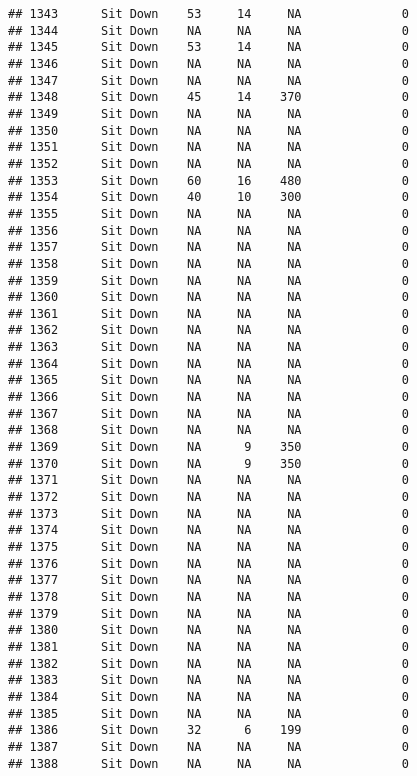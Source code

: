 \documentclass[
]{article}
\begin{document}
\begin{verbatim}
## 1343      Sit Down    53     14     NA              0
## 1344      Sit Down    NA     NA     NA              0
## 1345      Sit Down    53     14     NA              0
## 1346      Sit Down    NA     NA     NA              0
## 1347      Sit Down    NA     NA     NA              0
## 1348      Sit Down    45     14    370              0
## 1349      Sit Down    NA     NA     NA              0
## 1350      Sit Down    NA     NA     NA              0
## 1351      Sit Down    NA     NA     NA              0
## 1352      Sit Down    NA     NA     NA              0
## 1353      Sit Down    60     16    480              0
## 1354      Sit Down    40     10    300              0
## 1355      Sit Down    NA     NA     NA              0
## 1356      Sit Down    NA     NA     NA              0
## 1357      Sit Down    NA     NA     NA              0
## 1358      Sit Down    NA     NA     NA              0
## 1359      Sit Down    NA     NA     NA              0
## 1360      Sit Down    NA     NA     NA              0
## 1361      Sit Down    NA     NA     NA              0
## 1362      Sit Down    NA     NA     NA              0
## 1363      Sit Down    NA     NA     NA              0
## 1364      Sit Down    NA     NA     NA              0
## 1365      Sit Down    NA     NA     NA              0
## 1366      Sit Down    NA     NA     NA              0
## 1367      Sit Down    NA     NA     NA              0
## 1368      Sit Down    NA     NA     NA              0
## 1369      Sit Down    NA      9    350              0
## 1370      Sit Down    NA      9    350              0
## 1371      Sit Down    NA     NA     NA              0
## 1372      Sit Down    NA     NA     NA              0
## 1373      Sit Down    NA     NA     NA              0
## 1374      Sit Down    NA     NA     NA              0
## 1375      Sit Down    NA     NA     NA              0
## 1376      Sit Down    NA     NA     NA              0
## 1377      Sit Down    NA     NA     NA              0
## 1378      Sit Down    NA     NA     NA              0
## 1379      Sit Down    NA     NA     NA              0
## 1380      Sit Down    NA     NA     NA              0
## 1381      Sit Down    NA     NA     NA              0
## 1382      Sit Down    NA     NA     NA              0
## 1383      Sit Down    NA     NA     NA              0
## 1384      Sit Down    NA     NA     NA              0
## 1385      Sit Down    NA     NA     NA              0
## 1386      Sit Down    32      6    199              0
## 1387      Sit Down    NA     NA     NA              0
## 1388      Sit Down    NA     NA     NA              0

\end{verbatim}
\end{document}
